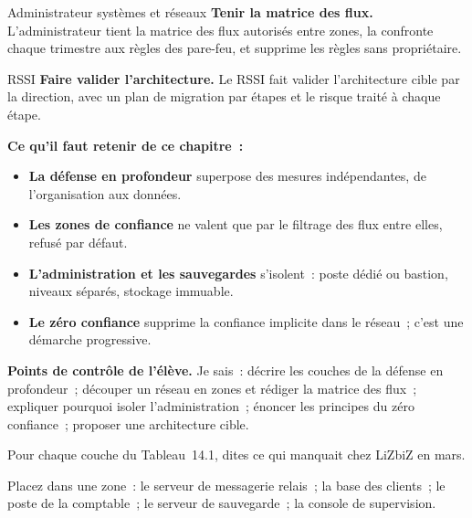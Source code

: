 \begin{boxmetier}{Administrateur systèmes et réseaux}
\textbf{Tenir la matrice des flux.} L'administrateur tient la matrice des
flux autorisés entre zones, la confronte chaque trimestre aux règles des
pare-feu, et supprime les règles sans propriétaire.
\end{boxmetier}

\begin{boxmetier}{RSSI}
\textbf{Faire valider l'architecture.} Le RSSI fait valider l'architecture
cible par la direction, avec un plan de migration par étapes et le risque
traité à chaque étape.
\end{boxmetier}

\separateur

\begin{boxresume}
\textbf{Ce qu'il faut retenir de ce chapitre~:}
\begin{itemize}
    \item \textbf{La défense en profondeur} superpose des mesures
          indépendantes, de l'organisation aux données.
    \item \textbf{Les zones de confiance} ne valent que par le filtrage des
          flux entre elles, refusé par défaut.
    \item \textbf{L'administration et les sauvegardes} s'isolent~: poste
          dédié ou bastion, niveaux séparés, stockage immuable.
    \item \textbf{Le zéro confiance} supprime la confiance implicite dans
          le réseau~; c'est une démarche progressive.
\end{itemize}
\end{boxresume}

\begin{boxinfo}
\textbf{Points de contrôle de l'élève.} Je sais~: décrire les couches de la
défense en profondeur~; découper un réseau en zones et rédiger la matrice
des flux~; expliquer pourquoi isoler l'administration~; énoncer les
principes du zéro confiance~; proposer une architecture cible.
\end{boxinfo}

\bigskip

\begin{boxexo}[title={\ding{45}\quad Exercice~14.1. Les couches \niveaubase}]
Pour chaque couche du Tableau~14.1, dites ce qui manquait chez LiZbiZ en
mars.
\end{boxexo}

\begin{boxexo}[title={\ding{45}\quad Exercice~14.2. Quelle zone~? \niveaubase}]
Placez dans une zone~: le serveur de messagerie relais~; la base des
clients~; le poste de la comptable~; le serveur de sauvegarde~; la console
de supervision.
\end{boxexo}

